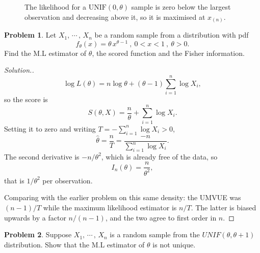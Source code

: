 \documentclass[12pt,a4paper]{report}
\theoremstyle{definition}
\newtheorem{problemx}{Problem}[section]
\newenvironment{problem}{\begin{problemx}}{\end{problemx}}
\newenvironment{solution}
  {\renewcommand{\qedsymbol}{}\begin{proof}[\textit{Solution}.]}
  {\end{proof}}
\begin{document}
\begin{figure}[H]
\centering
{}
\caption{The likelihood for a $\text{UNIF}(0, \theta)$ sample is zero below the
largest observation and decreasing above it, so it is maximised at $x_{(n)}$.}
\label{fig:uniformlik}
\end{figure}

\begin{problem}
Let $X_1, \, \cdots\, , \, X_n$ be a random sample from a distribution with pdf \[f_{\theta}(x) = \theta\, x^{\theta - 1}\  , \  0 < x < 1\ , \  \theta > 0.\]
Find the M.L estimator of $\theta$,  the scored function and the Fisher information.
\end{problem}

\begin{solution}
\[\log L(\theta) = n\log\theta + (\theta-1)\sum_{i=1}^{n}\log X_i ,\]
so the score is
\[S(\theta,X) = \frac{n}{\theta} + \sum_{i=1}^{n}\log X_i .\]
Setting it to zero and writing $T=-\sum_{i=1}^{n}\log X_i>0$,
\[\widehat{\theta} = \frac{n}{T} = \frac{-n}{\sum_{i=1}^{n}\log X_i}.\]
The second derivative is $-n/\theta^{2}$, which is already free of the data, so
\[I_n(\theta) = \frac{n}{\theta^{2}},\]
that is $1/\theta^{2}$ per observation.

Comparing with the earlier problem on this same density: the UMVUE was
$(n-1)/T$ while the maximum likelihood estimator is $n/T$. The latter is biased
upwards by a factor $n/(n-1)$, and the two agree to first order in $n$.
\end{solution}

\begin{problem}
Suppose $X_1, \, \cdots\, , \, X_n$  is a random sample from the $UNIF(\theta, \theta + 1)$ distribution. Show that the M.L estimator of $\theta$  is not unique.
\end{problem}
\end{document}
